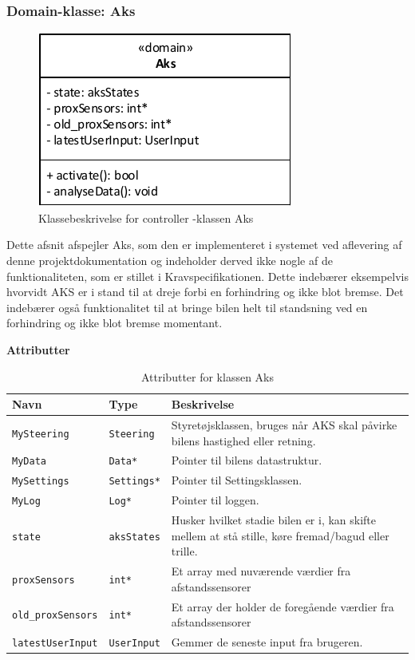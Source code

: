 

\subsubsection{Domain-klasse: Aks}\label{sec:aks_design}

\begin{figure}[h]
\centering
\includegraphics[scale=1]{../fig/diagrammer/bil/cd_aks.pdf}
\caption{Klassebeskrivelse for controller -klassen Aks}
\label{fig:cd_aks}
\end{figure}

Dette afsnit afspejler Aks, som den er implementeret i systemet ved aflevering af denne projektdokumentation og indeholder derved ikke nogle af de funktionaliteten, som er stillet i Kravspecifikationen.
Dette indebærer eksempelvis hvorvidt AKS er i stand til at dreje forbi en forhindring og ikke blot bremse. Det indebærer også funktionalitet til at bringe bilen helt til standsning ved en forhindring og ikke blot bremse momentant.

\clearpage

\textbf{Attributter}

\begin{table}[h]
\begin{tabularx}{\textwidth}{| Z | Z | L{9cm} |} \hline
Navn & Type & Beskrivelse \\\hline
\texttt{MySteering} & \texttt{Steering} & Styretøjsklassen, bruges når AKS skal påvirke bilens hastighed eller retning.\\\hline
\texttt{MyData} & \texttt{Data*} & Pointer til bilens datastruktur.\\\hline
\texttt{MySettings} & \texttt{Settings*} & Pointer til Settingsklassen. \\\hline
\texttt{MyLog} & \texttt{Log*} & Pointer til loggen. \\\hline
\texttt{state} & \texttt{aksStates} & Husker hvilket stadie bilen er i, kan skifte mellem at stå stille, køre fremad/bagud eller trille. \\\hline
\texttt{proxSensors} & \texttt{int*} & Et array med nuværende værdier fra afstandssensorer \\\hline
\texttt{old\_proxSensors} & \texttt{int*} & Et array der holder de foregående værdier fra afstandssensorer \\\hline
\texttt{latestUserInput} & \texttt{UserInput} & Gemmer de seneste input fra brugeren. \\ \hline
\end{tabularx}
\caption{Attributter for klassen Aks}
\label{table:attr_aks}
\end{table}

